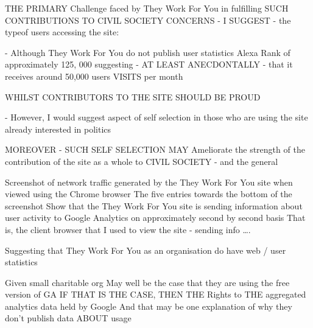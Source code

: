 THE PRIMARY Challenge faced by They Work For You in fulfilling SUCH CONTRIBUTIONS TO CIVIL SOCIETY CONCERNS - I SUGGEST - the typeof users accessing the site:

- Although They Work For You do not publish user statistics
Alexa Rank of approximately 125, 000 suggesting - AT LEAST ANECDONTALLY -  that it receives around 50,000 users VISITS per month
  
WHILST CONTRIBUTORS TO THE SITE SHOULD BE PROUD

- However, I would suggest
  aspect of self selection in those who are using the site
  already interested in politics

  MOREOVER - SUCH SELF SELECTION MAY Ameliorate the strength of the contribution of the site as a whole to CIVIL SOCIETY - and the general 

	Screenshot of network traffic generated by the They Work For You site when viewed using the Chrome browser
	The five entries towards the bottom of the screenshot
		Show that the They Work For You site is sending information about user activity to Google Analytics on approximately second by second basis
		That is, the client browser that I used to view the site - sending info ….

  Suggesting that They Work For You as an organisation do have web / user statistics
  
  Given small charitable org
  May well be the case that they are using the free version of GA
  IF THAT IS THE CASE, THEN THE Rights to THE aggregated analytics data held by Google
  And that may be one explanation of why they don’t publish data ABOUT usage